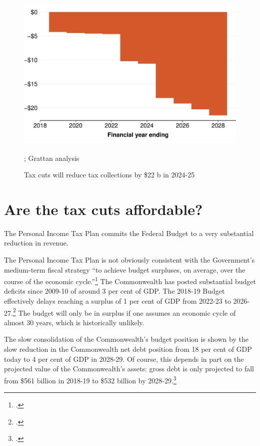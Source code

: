 \documentclass[submission]{grattan}\usepackage[]{graphicx}\usepackage[]{color}
\newenvironment{knitrout}{}{} %
\begin{document}
\begin{figure}
\caption{Tax cuts will reduce tax collections by \$22 b in 2024-25}\label{fig:1}
\begin{knitrout}
\color{fgcolor}
\includegraphics[width=4.47222in,height=2.92631723826715in]{atlas/fig1-1} 

\end{knitrout}


%
{\textcite{ATO2018}; Grattan analysis}
\end{figure}

\chapter{Are the tax cuts affordable? }\label{chap:are-the-tax-cuts-affordable}

The Personal Income Tax Plan commits the Federal Budget to a very substantial reduction in revenue.

The Personal Income Tax Plan is not obviously consistent with the Government's medium-term fiscal strategy ``to achieve budget surpluses, on average, over the course of the economic cycle.''\footcite[][3--7]{Treasury2018a}
The Commonwealth has posted substantial budget deficits since 2009-10 of around 3 per cent of GDP\@.
The 2018-19 Budget effectively delays reaching a surplus of 1 per cent of GDP from 2022-23 to 2026-27.\footcite[][3--15]{Treasury2018a}
The budget will only be in surplus if one assumes an economic cycle of almost 30 years, which is historically unlikely.

The slow consolidation of the Commonwealth's budget position is shown by the slow reduction in the Commonwealth net debt position from 18 per cent of GDP today to 4 per cent of GDP in 2028-29. Of course, this depends in part on the projected value of the Commonwealth's assets: gross debt is only projected to fall from \$561 billion in 2018-19 to \$532 billion by 2028-29.\footcite[][3--16]{Treasury2018a}
\end{document}

